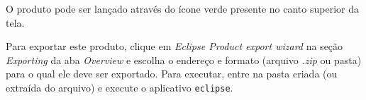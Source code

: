 \vspace{12pt}

O produto pode ser lançado através do ícone verde presente no canto superior da
tela.

\vspace{12pt}

Para exportar este produto, clique em \textit{Eclipse Product export wizard} na
seção \textit{Exporting} da aba \textit{Overview} e escolha o endereço e formato
(arquivo \textit{.zip} ou pasta) para o qual ele deve ser exportado. Para
executar, entre na pasta criada (ou extraída do arquivo) e execute o aplicativo
\texttt{eclipse}.
